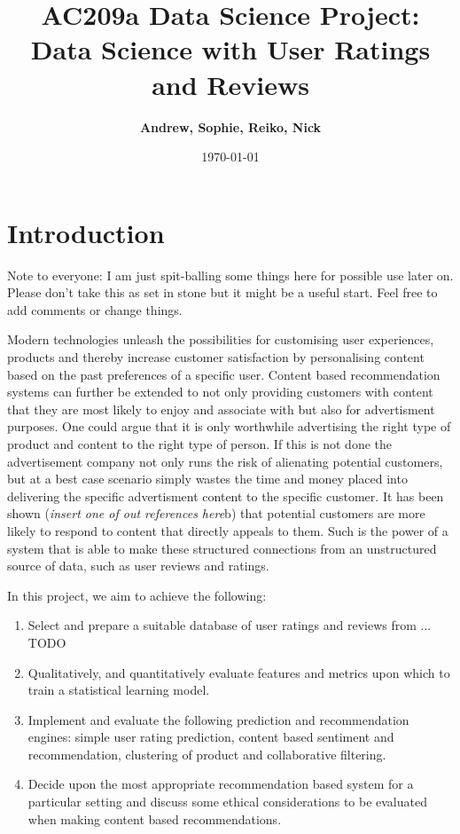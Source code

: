 \documentclass[11pt]{article}
\title{
\vspace{1in}
\textmd{\textbf{AC209a Data Science Project: Data Science with User Ratings and Reviews}}\\
\vspace{2cm}
}
\author{\textbf{Andrew, Sophie, Reiko, Nick}}
\date{\today} %
\begin{document}
\maketitle

\section*{Introduction}
	Note to everyone: I am just spit-balling some things here for possible use later on. Please don't take this as set in stone but it might be a useful start. Feel free to add comments or change things.

	Modern technologies unleash the possibilities for customising user experiences, products and thereby increase customer satisfaction by personalising content
	based on the past preferences of a specific user. Content based recommendation systems can further be extended to not only providing customers with content that they are most likely to enjoy and associate with but also for advertisment purposes. One could argue that it is only worthwhile advertising the right type of product and content to the right type of person. If this is not done the advertisement company not only runs the risk of alienating potential customers, but at a best case scenario simply wastes the time and money placed into delivering the specific advertisment content to the specific customer. It has been shown (\textit{insert one of out references here}b) that potential customers are more likely to respond to content that directly appeals to them. Such is the power of a system that is able to make these structured connections from an unstructured source of data, such as user reviews and ratings.

	In this project, we aim to achieve the following:
	\begin{enumerate}
		\item Select and prepare a suitable database of user ratings and reviews from ... TODO
		\item Qualitatively, and quantitatively evaluate features and metrics upon which to train a statistical learning model.
		\item Implement and evaluate the following prediction and recommendation engines: simple user rating prediction, content based sentiment and recommendation, clustering of product and collaborative filtering.
		\item Decide upon the most appropriate recommendation based system for a particular setting and discuss some ethical considerations to be evaluated when making content based recommendations.
	\end{enumerate}
\end{document}
